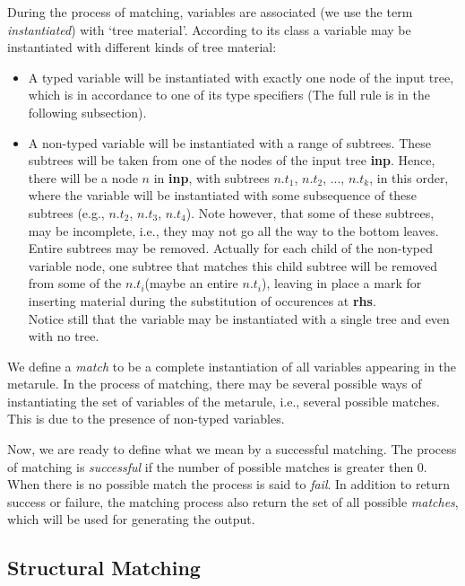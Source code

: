 During the process of matching, variables are associated (we use the
term {\it instantiated}) with `tree material'.  According to its class
a variable may be instantiated with different kinds of tree material:

\begin{itemize}
\item   A typed variable will be instantiated with exactly one node of
        the input tree, which is in accordance to one of its type specifiers
        (The full rule is in the following subsection). 

\item   A non-typed variable will be instantiated with a range of subtrees.
        These subtrees will be taken from one of the nodes of the input tree
        {\bf inp}. Hence, there will be a node $n$ in {\bf inp}, with subtrees
        $n.t_1$, $n.t_2$, ..., $n.t_k$, in this order, where the variable
        will be instantiated with some subsequence of these subtrees 
        (e.g., $n.t_2$, $n.t_3$, $n.t_4$). Note however, that some of these
        subtrees, may be incomplete, i.e., they may not go all the way to the 
        bottom leaves. Entire subtrees may be removed. Actually for each
        child of the non-typed variable node, one subtree that matches this
        child subtree will be removed from some of the $n.t_i$(maybe an entire
        $n.t_i$), leaving in place a mark for inserting material during the
        substitution of occurences at {\bf rhs}.\\
        Notice still that the variable may
        be instantiated with a single tree and even with no tree. 

\end{itemize} 

We define a {\it match} to be a complete instantiation of all variables 
appearing in the metarule. In the process of matching, there may be several
possible ways of instantiating the set of variables of the metarule, i.e.,
several possible matches. This is due to the presence of non-typed variables.

Now, we are ready to define what we mean by a successful matching. The process
of matching is {\it successful} 
if the number of possible matches is greater then 0.
When there is no possible match the process is said to {\it fail}.
In addition to return success or failure, the 
matching process also return the set of
all possible {\it matches}, which will be used for generating the output.

\subsection{Structural Matching}

